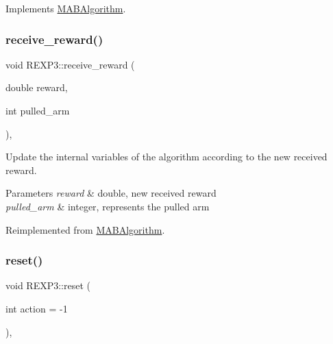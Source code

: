 Implements \mbox{\hyperlink{class_m_a_b_algorithm_afb48f01df0e1860d19759f6e20335007}{M\+A\+B\+Algorithm}}.

\mbox{\label{class_r_e_x_p3_a535d6667ecfa71568a68a5a09c44d4bf}} 
\subsubsection{\texorpdfstring{receive\+\_\+reward()}{receive\_reward()}}
{\footnotesize\ttfamily void R\+E\+X\+P3\+::receive\+\_\+reward (\begin{DoxyParamCaption}\item[{double}]{reward,  }\item[{int}]{pulled\+\_\+arm }\end{DoxyParamCaption})\hspace{0.3cm}{\ttfamily [override]}, {\ttfamily [virtual]}}



Update the internal variables of the algorithm according to the new received reward. 


\begin{DoxyParams}{Parameters}
{\em reward} & double, new received reward \\
\hline
{\em pulled\+\_\+arm} & integer, represents the pulled arm \\
\hline
\end{DoxyParams}


Reimplemented from \mbox{\hyperlink{class_m_a_b_algorithm_aa584b3d6b86fa050e3389be9781b5782}{M\+A\+B\+Algorithm}}.

\mbox{\label{class_r_e_x_p3_ad99a97c07f75addc64e612774de81307}} 
\subsubsection{\texorpdfstring{reset()}{reset()}}
{\footnotesize\ttfamily void R\+E\+X\+P3\+::reset (\begin{DoxyParamCaption}\item[{int}]{action = {\ttfamily -\/1} }\end{DoxyParamCaption})\hspace{0.3cm}{\ttfamily [override]}, {\ttfamily [virtual]}}



